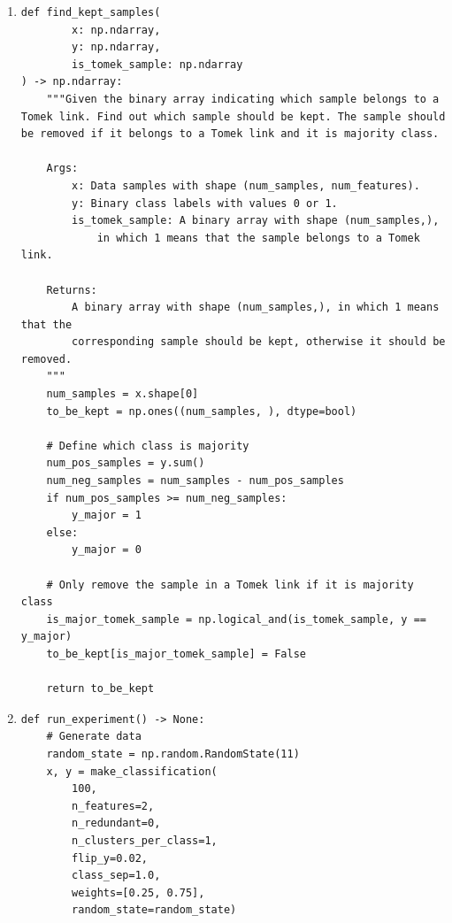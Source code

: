 \documentclass[a4paper]{article}
\begin{document}
{\begin{enumerate}
\begin{lstlisting}
    # A sample belongs to a Tomek link if its closest inter-class sample is closer
    # than its closest intra-class sample.
    tomek_pairs = np.stack([np.arange(num_samples), min_dist_inds_diff_y], axis=1)
    # tomek_pairs has shape (num_tomek_pairs, 2) in the end
    tomek_pairs = tomek_pairs[min_dist_diff_y <= min_dist_same_y]

    # create a binary array and set the elements to 1 if the corresponding indices
    # appear in the tomek_pairs.
    is_tomek_sample = np.zeros((num_samples, ), dtype=bool)
    is_tomek_sample[tomek_pairs.flat] = True
    return is_tomek_sample

\end{lstlisting}

\item 

\begin{lstlisting}
def find_kept_samples(
        x: np.ndarray,
        y: np.ndarray,
        is_tomek_sample: np.ndarray
) -> np.ndarray:
    """Given the binary array indicating which sample belongs to a Tomek link. Find out which sample should be kept. The sample should be removed if it belongs to a Tomek link and it is majority class.

    Args:
        x: Data samples with shape (num_samples, num_features).
        y: Binary class labels with values 0 or 1.
        is_tomek_sample: A binary array with shape (num_samples,), 
            in which 1 means that the sample belongs to a Tomek link.

    Returns:
        A binary array with shape (num_samples,), in which 1 means that the 
        corresponding sample should be kept, otherwise it should be removed.
    """
    num_samples = x.shape[0]
    to_be_kept = np.ones((num_samples, ), dtype=bool)

    # Define which class is majority
    num_pos_samples = y.sum()
    num_neg_samples = num_samples - num_pos_samples
    if num_pos_samples >= num_neg_samples:
        y_major = 1
    else:
        y_major = 0

    # Only remove the sample in a Tomek link if it is majority class
    is_major_tomek_sample = np.logical_and(is_tomek_sample, y == y_major)
    to_be_kept[is_major_tomek_sample] = False

    return to_be_kept
\end{lstlisting}

\item 
\begin{lstlisting}
def run_experiment() -> None:
    # Generate data
    random_state = np.random.RandomState(11)
    x, y = make_classification(
        100,
        n_features=2,
        n_redundant=0,
        n_clusters_per_class=1,
        flip_y=0.02,
        class_sep=1.0,
        weights=[0.25, 0.75],
        random_state=random_state)


\end{lstlisting}
\end{enumerate}}
\end{document}
